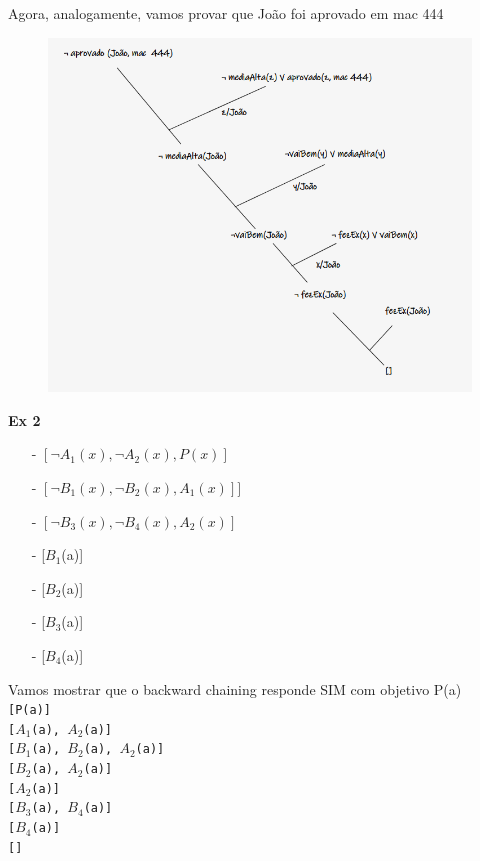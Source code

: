 \documentclass{article}
\begin{document}
    Agora, analogamente, vamos provar que João foi aprovado em mac 444

    \begin{figure}[H]
        \centering
        \includegraphics[width=12cm]{img/joao.png}
    \end{figure}

    \textbf{Ex 2}

    \begin{itemize}
        \item [-] $[\neg A_1(x), \neg A_2(x), P(x)]$
        \item [-] $[\neg B_1(x), \neg B_2(x), A_1(x)]]$
        \item [-] $[\neg B_3(x), \neg B_4(x), A_2(x)]$
        \item [-] [$B_1$(a)]
        \item [-] [$B_2$(a)]
        \item [-] [$B_3$(a)]
        \item [-] [$B_4$(a)]
    \end{itemize}

Vamos mostrar que o backward chaining responde SIM
com objetivo P(a)\\

    \texttt{[P(a)]}\\
    \texttt{[$A_1$(a), $A_2$(a)]}\\
    \texttt{[$B_1$(a), $B_2$(a), $A_2$(a)]}\\
    \texttt{[$B_2$(a), $A_2$(a)]}\\
    \texttt{[$A_2$(a)]}\\
    \texttt{[$B_3$(a), $B_4$(a)]}\\
    \texttt{[$B_4$(a)]}\\
    \texttt{[]}\\
\end{document}

